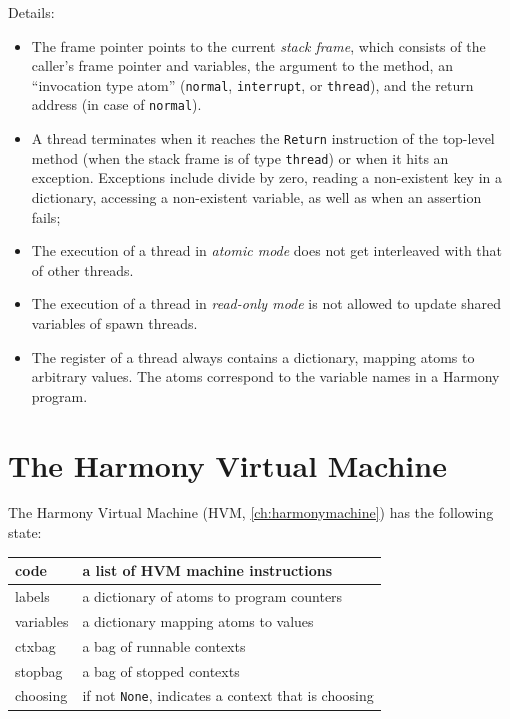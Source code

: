 \documentclass{report}
\begin{document}
Details:
\begin{itemize}
\item The frame pointer points to the current \emph{stack frame},
which consists of the caller's frame pointer and variables, the argument to
the method, an ``invocation type atom'' (\texttt{normal}, \texttt{interrupt}, or
\texttt{thread}), and the return address (in case of \texttt{normal}).
\item A thread terminates when it reaches the \texttt{Return} instruction
of the top-level method (when the stack frame is of type \texttt{thread})
or when it hits an exception.  Exceptions include divide by zero,
reading a non-existent key in a dictionary, accessing a non-existent
variable, as well as when an assertion fails;
\item The execution of a thread in \emph{atomic mode} does not get interleaved
with that of other threads.
\item The execution of a thread in \emph{read-only mode} is not allowed
to update shared variables of spawn threads.
\item The register of a thread always contains a dictionary, mapping
atoms to arbitrary values.  The atoms correspond to the variable names
in a Harmony program.
\end{itemize}

\chapter{The Harmony Virtual Machine}\label{app:hvm}

The Harmony Virtual Machine (HVM, \autoref{ch:harmonymachine})
has the following state:

\vspace{1em}
\begin{tabular}{|l|l|}
\hline
code & a list of HVM machine instructions \\
\hline
labels & a dictionary of atoms to program counters \\
\hline
variables & a dictionary mapping atoms to values \\
\hline
ctxbag & a bag of runnable contexts \\
\hline
stopbag & a bag of stopped contexts \\
\hline
choosing & if not \texttt{None}, indicates a context that is choosing \\
\hline
\end{tabular}
\vspace{1em}
\end{document}
